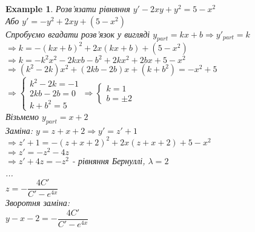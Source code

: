 \documentclass[a4paper, 10pt]{article}
\theoremstyle{theoremdd}
\theoremstyle{theoremdd}
\theoremstyle{theoremdd}
\theoremstyle{theoremdd}
\newtheorem{example}[theorem]{Example}
\theoremstyle{theoremdd}
\theoremstyle{theoremdd}
\theoremstyle{theoremdd}
\theoremstyle{theoremdd}
\begin{document}
\begin{example}
 Розв'язати рівняння $y' - 2xy+y^2 = 5-x^2$\\
Або $y' = -y^2 + 2xy + (5-x^2)$\\
Спробуємо вгадати розв'язок у вигляді $y_{part} = kx + b \Rightarrow y'_{part} = k$\\
$\Rightarrow k = -(kx+b)^2 + 2x(kx+b) + (5-x^2)$\\
$\Rightarrow k = -k^2x^2 - 2kxb - b^2 + 2kx^2 + 2bx + 5 - x^2$\\
$\Rightarrow (k^2-2k)x^2 + (2kb-2b)x + (k+b^2) = -x^2 + 5$\\
$\Rightarrow \begin{cases}
k^2 - 2k = -1\\
2kb - 2b = 0\\
k+b^2=5
\end{cases} \Rightarrow \begin{cases} k = 1 \\ b = \pm 2 \end{cases}$\\
Візьмемо $y_{part} = x + 2$
\bigskip \\
Заміна: $y = z + x + 2 \Rightarrow y' = z' + 1$\\
$\Rightarrow z' + 1 = -(z+x+2)^2 + 2x(z+x+2) + 5 - x^2$\\
$\Rightarrow z' = -z^2 - 4z$\\
$\Rightarrow z' + 4z = -z^2$ - рівняння Бернуллі, $\lambda = 2$\\
...\\
$z = -\dfrac{4C'}{C' - e^{4x}}$\\
Зворотня заміна:\\
$y-x-2 = -\dfrac{4C'}{C' - e^{4x}}$
\end{example}
\end{document}
